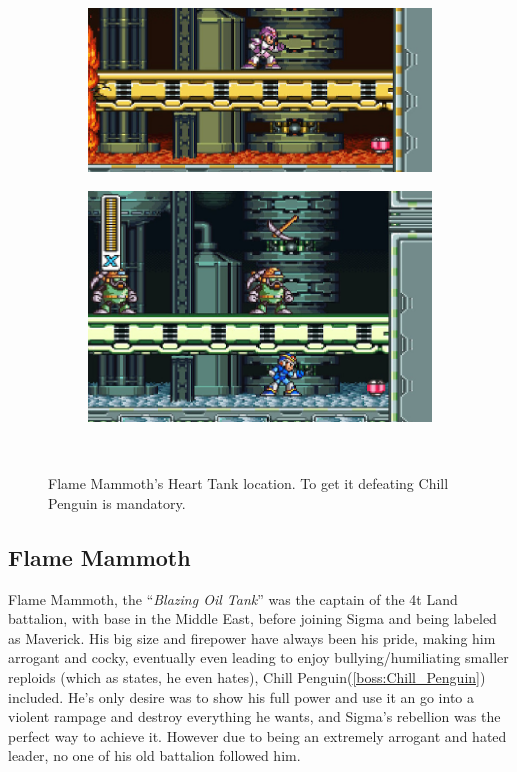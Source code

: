 \begin{figure}[h]
	\centering
	\begin{subfigure}{0.49\textwidth}
		\centering
		\includegraphics[width=\linewidth]{figures/X1/Flame_heart_1.jpg}
		\caption{}
	\end{subfigure}
	\begin{subfigure}{0.5\textwidth}
		\centering
		\includegraphics[width=\linewidth]{figures/X1/Flame_heart_2.jpg}
		\caption{}
	\end{subfigure}\\
	\caption{Flame Mammoth's Heart Tank location. To get it defeating Chill Penguin is mandatory.}
\end{figure}

\subsection{Flame Mammoth}\label{boss:Flame_mammoth}
Flame Mammoth, the ``\textit{Blazing Oil Tank}''\cite{book:MMX_Complete_art} was the captain of the 4t Land battalion, with base in the Middle East, before joining Sigma and being labeled as Maverick. His big size and firepower have always been his pride, making him arrogant and cocky, eventually even leading to enjoy bullying/humiliating smaller reploids (which as \cite{wayback:X_resources} states, he even hates), Chill Penguin(\ref{boss:Chill_Penguin})\cite{wiki:Flame_mammoth} included. He's only desire was to show his full power and use it an go into a violent rampage and destroy everything he wants, and Sigma's rebellion was the perfect way to achieve it. However due to being an extremely arrogant and hated leader, no one of his old battalion followed him\cite{MHX:manual}.

